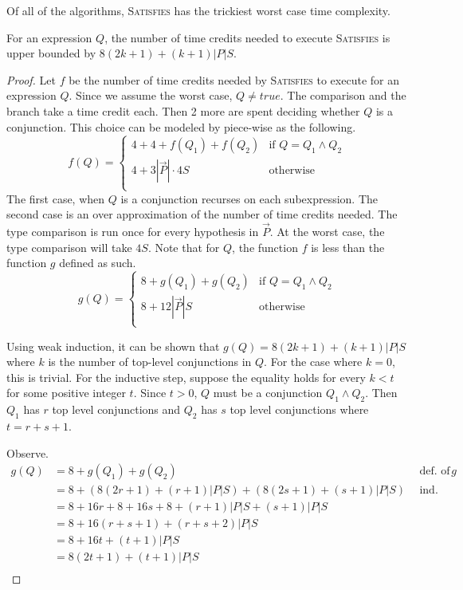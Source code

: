 Of all of the algorithms, \textsc{Satisfies} has the trickiest worst case time complexity.

\begin{theorem}
  \label{thm:satsfies_time_complexity}
  For an expression $Q$, the number of time credits needed to execute \textsc{Satisfies} is upper bounded by $8(2k+1) + (k+1)|P|S$.
\end{theorem}
  \begin{proof}
    Let $f$ be the number of time credits needed by \textsc{Satisfies} to execute for an expression $Q$. Since we assume the worst case, $Q \neq true$. The comparison and the branch take a time credit each. Then 2 more are spent deciding whether $Q$ is a conjunction. This choice can be modeled by piece-wise as the following.
    $$
      f(Q) =
        \begin{cases}
          4 + 4 + f(Q_1) + f(Q_2)            & \text{if $Q = Q_1 \wedge Q_2$} \\
          4+3 |\overrightarrow{P}|\cdot 4S   & \text{otherwise} \\
        \end{cases}
    $$
    The first case, when $Q$ is a conjunction recurses on each subexpression. The second case is an over approximation of the number of time credits needed. The type comparison is run once for every hypothesis in $\overrightarrow{P}$. At the worst case, the type comparison will take $4S$. Note that for $Q$, the function $f$ is less than the function $g$ defined as such.
    $$
      g(Q) =
        \begin{cases}
          8 + g(Q_1) + g(Q_2)           & \text{if $Q = Q_1 \wedge Q_2$} \\
          8 + 12 |\overrightarrow{P}| S & \text{otherwise} \\
        \end{cases}
    $$

    Using weak induction, it can be shown that $g(Q) = 8(2k+1) + (k+1)|P|S$ where $k$ is the number of top-level conjunctions in $Q$. For the case where $k=0$, this is trivial. For the inductive step, suppose the equality holds for every $k < t$ for some positive integer $t$. Since $t > 0$, $Q$ must be a conjunction $Q_1 \wedge Q_2$. Then $Q_1$ has $r$ top level conjunctions and $Q_2$ has $s$ top level conjunctions where $t = r + s + 1$.

    Observe.
      \begin{align*}
        g(Q) &= 8 + g(Q_1) + g(Q_2) & ~~\mbox{def. of $g$} \\
             &= 8 + (8(2r+1) + (r+1)|P|S) + (8(2s+1) + (s+1)|P|S)
                & ~~\mbox{ind. hyp.} \\
             &= 8 + 16r+8 + 16s+8 + (r+1)|P|S + (s+1)|P|S \\
             &= 8 + 16 (r + s + 1) + (r + s + 2)|P|S \\
             &= 8 + 16 t + (t + 1)|P|S \\
             &= 8(2t + 1) + (t + 1)|P|S \\
      \end{align*}
  \end{proof}

